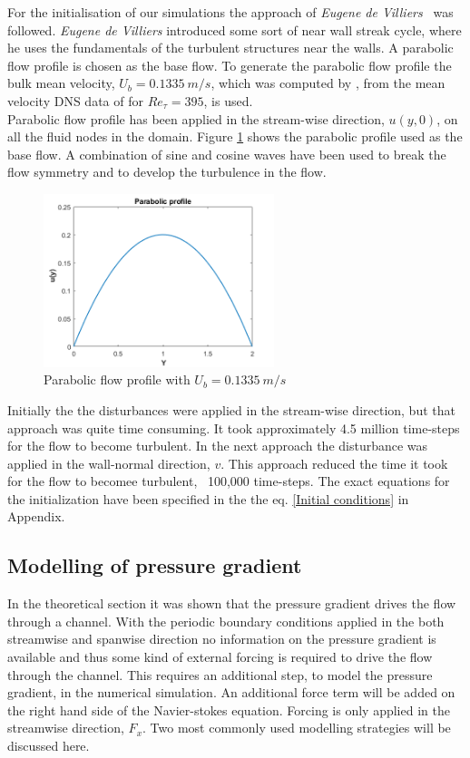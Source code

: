 For the initialisation of our simulations the approach of \emph{Eugene de Villiers}~\cite{devilliers:phd} was followed. \emph{Eugene de Villiers} introduced some sort of near wall streak cycle, where he uses the fundamentals of the turbulent structures near the walls. A parabolic flow profile is chosen as the base flow. To generate the parabolic flow profile the bulk mean velocity, $U_b = 0.1335\ m/s$, which was computed by \cite{devilliers:phd}, from the mean velocity DNS data of \cite{moser:kim:mansour:99} for $Re_\tau = 395$, is used.\\

Parabolic flow profile has been applied in the stream-wise direction, $u(y,0)$,  on all the fluid nodes in the domain. Figure \ref{para profile} shows the parabolic profile used as the base flow. A combination of sine and cosine waves have been used to break the flow symmetry and to develop the turbulence in the flow. 
%
\begin{figure}[h]
    \centering
    \includegraphics[width=0.6\textwidth]{figur/Parabolic_profile.png}
    \caption{Parabolic flow profile with $U_b = 0.1335\ m/s$}
    \label{para profile}
\end{figure}
%
Initially the the disturbances were applied in the stream-wise direction, but that approach was quite time consuming. It took approximately 4.5 million time-steps for the flow to become turbulent. In the next approach the disturbance was applied in the wall-normal direction, $v$. This approach reduced the time it took for the flow to becomee turbulent, ~100,000 time-steps. The exact equations for the initialization have been specified in the the eq. \ref{Initial conditions} in Appendix.

\subsection{Modelling of pressure gradient}
In the theoretical section it was shown that the pressure gradient drives the flow through a channel. With the periodic boundary conditions applied in the both streamwise and spanwise direction no information on the pressure gradient is available and thus some kind of external forcing is required to drive the flow through the channel. This requires an additional step, to model the pressure gradient, in the numerical simulation. An additional force term will be added on the right hand side of the Navier-stokes equation. Forcing is only applied in the streamwise direction, $F_x$. Two most commonly used modelling strategies will be discussed here.

